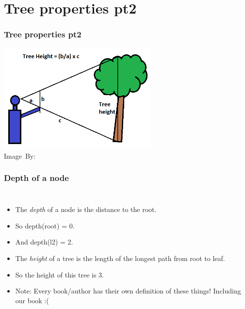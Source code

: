 \section{Tree properties pt2}
\label{sec:tree_functions}

\begin{frame}
	\frametitle{Tree properties pt2}
	\begin{center}
		\includegraphics[width=0.6\textwidth]{figures/stick.png}\\
		\hspace*{15pt}\hbox{\scriptsize Image By:}
	\end{center}
\end{frame}

\begin{frame}
	\frametitle{Depth of a node}

	\begin{columns}
		\begin{itemize}
			\item The \textit{depth} of a \alert<5->{node} is the distance to the root.
				\pause
			\item So depth(root) = 0.
			\item And depth(l2) = 2.
				\pause
			\item The \textit{height} of a \alert<5->{tree} is the length of the longest path from root to leaf.
				\pause
			\item So the height of this tree is 3.
				\pause
			\item Note: Every book/author has their own definition of these things! Including our book :(
		\end{itemize}
	\end{columns}
	
\end{frame}

